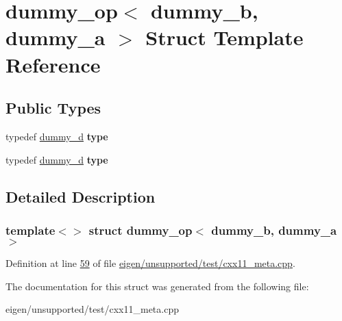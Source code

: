 \hypertarget{structdummy__op_3_01dummy__b_00_01dummy__a_01_4}{}\section{dummy\+\_\+op$<$ dummy\+\_\+b, dummy\+\_\+a $>$ Struct Template Reference}
\label{structdummy__op_3_01dummy__b_00_01dummy__a_01_4}
\subsection*{Public Types}
\begin{DoxyCompactItemize}
\item 
\mbox{\label{structdummy__op_3_01dummy__b_00_01dummy__a_01_4_a8cf2a7eec34ea12192c19203e03c5bbf}} 
typedef \hyperlink{structdummy__d}{dummy\+\_\+d} {\bfseries type}
\item 
\mbox{\label{structdummy__op_3_01dummy__b_00_01dummy__a_01_4_a8cf2a7eec34ea12192c19203e03c5bbf}} 
typedef \hyperlink{structdummy__d}{dummy\+\_\+d} {\bfseries type}
\end{DoxyCompactItemize}


\subsection{Detailed Description}
\subsubsection*{template$<$$>$\newline
struct dummy\+\_\+op$<$ dummy\+\_\+b, dummy\+\_\+a $>$}



Definition at line \hyperlink{eigen_2unsupported_2test_2cxx11__meta_8cpp_source_l00059}{59} of file \hyperlink{eigen_2unsupported_2test_2cxx11__meta_8cpp_source}{eigen/unsupported/test/cxx11\+\_\+meta.\+cpp}.



The documentation for this struct was generated from the following file\+:\begin{DoxyCompactItemize}
\item 
eigen/unsupported/test/cxx11\+\_\+meta.\+cpp\end{DoxyCompactItemize}
